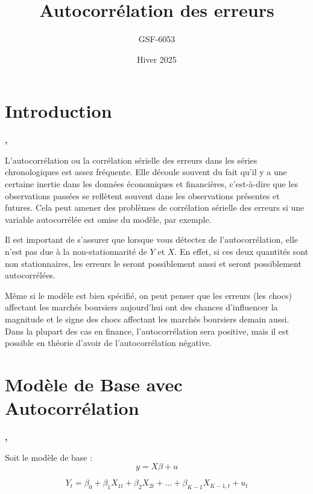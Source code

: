 \documentclass[14pt]{extarticle} %
\title{\textbf{Autocorrélation des erreurs}}
\author{GSF-6053}
\date{Hiver 2025}
\theoremstyle{definition}
\theoremstyle{plain}
\begin{document}
\maketitle

\tableofcontents

\onehalfspacing
\newpage

\section{Introduction}

\textbf{\textcolor{blue}{\cite{gujarati2010}, \cite{wooldridge2010}}}

L’autocorrélation ou la corrélation sérielle des erreurs dans les séries chronologiques est assez fréquente. Elle découle souvent du fait qu’il y a une certaine inertie dans les données économiques et financières, c’est-à-dire que les observations passées se reflètent souvent dans les observations présentes et futures. Cela peut amener des problèmes de corrélation sérielle des erreurs si une variable autocorrélée est omise du modèle, par exemple.

Il est important de s’assurer que lorsque vous détectez de l’autocorrélation, elle n’est pas due à la non-stationnarité de $Y$ et $X$. En effet, si ces deux quantités sont non stationnaires, les erreurs le seront possiblement aussi et seront possiblement autocorrélées.

Même si le modèle est bien spécifié, on peut penser que les erreurs (les chocs) affectant les marchés boursiers aujourd’hui ont des chances d’influencer la magnitude et le signe des chocs affectant les marchés boursiers demain aussi. Dans la plupart des cas en finance, l’autocorrélation sera positive, mais il est possible en théorie d’avoir de l’autocorrélation négative.

\section{Modèle de Base avec Autocorrélation}

\textbf{\textcolor{blue}{\cite{gujarati2010}, \cite{wooldridge2010}}}

Soit le modèle de base :
\begin{equation}
y = X\beta + u
\end{equation}

\begin{equation}
Y_t = \beta_0 + \beta_1 X_{1t} + \beta_2 X_{2t} + \dots + \beta_{K-1} X_{K-1,t} + u_t
\end{equation}
\end{document}
